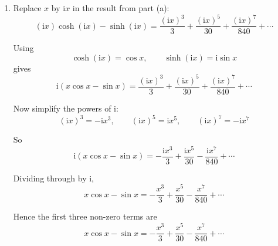 \documentclass[leqno]{article}
\begin{document}
\begin{enumerate}[
  label=\textbf{\arabic*.},
  leftmargin=*,
  topsep=0pt,
  partopsep=0pt,
  parsep=0pt
]
\begin{tcolorbox}[colback=white, colframe=scarlet, title={\textbf{Solution}}, breakable, grow to left by=6mm, grow to right by=10mm]
\begin{enumerate}[label=\textbf{(\alph*)}]
  Therefore
  \begin{align*}
  x\cosh x-\sinh x
  &=x\left(1+\frac{x^2}{2}+\frac{x^4}{24}+\frac{x^6}{720}+\cdots\right)
  -\left(x+\frac{x^3}{6}+\frac{x^5}{120}+\frac{x^7}{5040}+\cdots\right) \\
  &=\left(x+\frac{x^3}{2}+\frac{x^5}{24}+\frac{x^7}{720}+\cdots\right)
  -\left(x+\frac{x^3}{6}+\frac{x^5}{120}+\frac{x^7}{5040}+\cdots\right) \\
  &=\left(\frac{1}{2}-\frac{1}{6}\right)x^3+\left(\frac{1}{24}-\frac{1}{120}\right)x^5+\left(\frac{1}{720}-\frac{1}{5040}\right)x^7+\cdots \\
  &=\frac{x^3}{3}+\frac{x^5}{30}+\frac{x^7}{840}+\cdots
  \end{align*}

  Hence the first three non-zero terms are
  \[
  x\cosh x-\sinh x=\frac{x^3}{3}+\frac{x^5}{30}+\frac{x^7}{840}+\cdots
  \]

  \item Replace $x$ by $\mathrm{i}x$ in the result from part (a):
  \[
  (\mathrm{i}x)\cosh(\mathrm{i}x)-\sinh(\mathrm{i}x)
  =\frac{(\mathrm{i}x)^3}{3}+\frac{(\mathrm{i}x)^5}{30}+\frac{(\mathrm{i}x)^7}{840}+\cdots
  \]

  Using
  \[
  \cosh(\mathrm{i}x)=\cos x,\qquad \sinh(\mathrm{i}x)=\mathrm{i}\sin x
  \]
  gives
  \[
  \mathrm{i}(x\cos x-\sin x)
  =\frac{(\mathrm{i}x)^3}{3}+\frac{(\mathrm{i}x)^5}{30}+\frac{(\mathrm{i}x)^7}{840}+\cdots
  \]

  Now simplify the powers of $\mathrm{i}$:
  \[
  (\mathrm{i}x)^3=-\mathrm{i}x^3,\qquad
  (\mathrm{i}x)^5=\mathrm{i}x^5,\qquad
  (\mathrm{i}x)^7=-\mathrm{i}x^7
  \]

  So
  \[
  \mathrm{i}(x\cos x-\sin x)
  =-\frac{\mathrm{i}x^3}{3}+\frac{\mathrm{i}x^5}{30}-\frac{\mathrm{i}x^7}{840}+\cdots
  \]

  Dividing through by $\mathrm{i}$,
  \[
  x\cos x-\sin x=-\frac{x^3}{3}+\frac{x^5}{30}-\frac{x^7}{840}+\cdots
  \]

  Hence the first three non-zero terms are
  \[
  x\cos x-\sin x=-\frac{x^3}{3}+\frac{x^5}{30}-\frac{x^7}{840}+\cdots
  \]
\end{enumerate}
\end{tcolorbox}


\end{enumerate}
\end{document}
